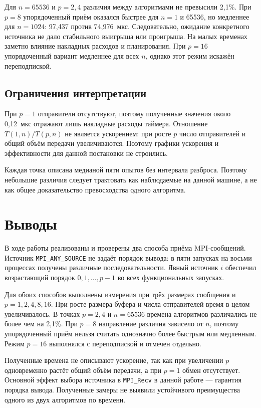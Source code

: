 \documentclass[14pt,a4paper]{extarticle}
\begin{document}
Для $n=65536$ и $p=2,4$ различия между алгоритмами не превысили 2,1\%.
При $p=8$ упорядоченный приём оказался быстрее для $n=1$ и 65536, но медленнее
для $n=1024$: 97,437 против 74,976~мкс. Следовательно, ожидание конкретного
источника не дало стабильного выигрыша или проигрыша. На малых временах
заметно влияние накладных расходов и планирования. При $p=16$
упорядоченный вариант медленнее для всех $n$, однако этот режим искажён
переподпиской.

\subsection{Ограничения интерпретации}

При $p=1$ отправители отсутствуют, поэтому полученные значения около
0,12~мкс отражают лишь накладные расходы таймера. Отношение
$T(1,n)/T(p,n)$ не является ускорением: при росте $p$ число отправителей и
общий объём передачи увеличиваются. Поэтому графики ускорения и
эффективности для данной постановки не строились.

Каждая точка описана медианой пяти опытов без интервала разброса.
Поэтому небольшие различия следует трактовать как наблюдаемые на данной
машине, а не как общее доказательство превосходства одного алгоритма.

\section{Выводы}

В ходе работы реализованы и проверены два способа приёма MPI-сообщений.
Источник \texttt{MPI\_ANY\_SOURCE} не задаёт порядок вывода: в пяти запусках на
восьми процессах получены различные последовательности. Явный источник $i$
обеспечил возрастающий порядок $0,1,\ldots,p-1$ во всех функциональных
запусках.

Для обоих способов выполнены измерения при трёх размерах сообщения и
$p=1,2,4,8,16$. При росте размера буфера и числа отправителей время в целом
увеличивалось. В точках $p=2,4$ и $n=65536$ времена алгоритмов различались не
более чем на 2,1\%. При $p=8$ направление различия зависело от $n$, поэтому
упорядоченный приём нельзя считать однозначно более быстрым или медленным.
Режим $p=16$ выполнялся с переподпиской и отмечен отдельно.

Полученные времена не описывают ускорение, так как при увеличении $p$
одновременно растёт общий объём передачи, а при $p=1$ обмен отсутствует.
Основной эффект выбора источника в \texttt{MPI\_Recv} в данной работе ---
гарантия порядка вывода. Полученные замеры не выявили устойчивого
преимущества одного из двух алгоритмов по времени.
\end{document}
